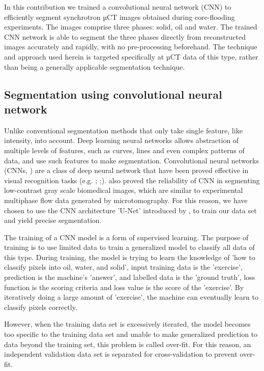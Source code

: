 \documentclass[draft,linenumbers]{agujournal2018}
\begin{document}
In this contribution we trained a convolutional neural network (CNN) to efficiently segment synchrotron µCT images obtained during core-flooding experiments. The images comprise three phases: solid, oil and water. The trained CNN network is able to segment the three phases directly from reconstructed images accurately and rapidly, with no pre-processing beforehand. The technique and approach used herein is targeted specifically at µCT data of this type, rather than being a generally applicable segmentation technique.

\subsection{Segmentation using convolutional neural network}
Unlike conventional segmentation methods that only take single feature, like intensity, into account. Deep learning neural networks allows abstraction of multiple levels of features, such as curves, lines and even complex patterns of data, and use such features to make segmentation. Convolutional neural networks (CNNs, \citet{lecun2015deep}) are a class of deep neural network that have been proved effective in visual recognition tasks (e.g. \citet{krizhevsky2012imagenet}; \citet{long2015fully};\citet{girshick2014rich}). \citet{ronneberger2015u} also proved the reliability of CNN in segmenting low-contrast gray scale biomedical images, which are similar to experimental multiphase flow data generated by microtomography. For this reason, we have chosen to use the CNN architecture 'U-Net' introduced by \citet{ronneberger2015u}, to train our data set and yield precise segmentation.

The training of a CNN model is a form of supervised learning. The purpose of training is to use limited data to train a generalized model to classify all data of this type. During training, the model is trying to learn the knowledge of 'how to classify pixels into oil, water, and solid', input training data is the 'exercise', prediction is the machine's 'answer', and labelled data is the 'ground truth', loss function is the scoring criteria and loss value is the score of the 'exercise'. By iteratively doing a large amount of 'exercise', the machine can eventually learn to classify pixels correctly.

However, when the training data set is excessively iterated, the model becomes too specific to the training data set and unable to make generalized prediction to data beyond the training set, this problem is called over-fit. For this reason, an independent validation data set is separated for cross-validation to prevent over-fit.
\end{document}
